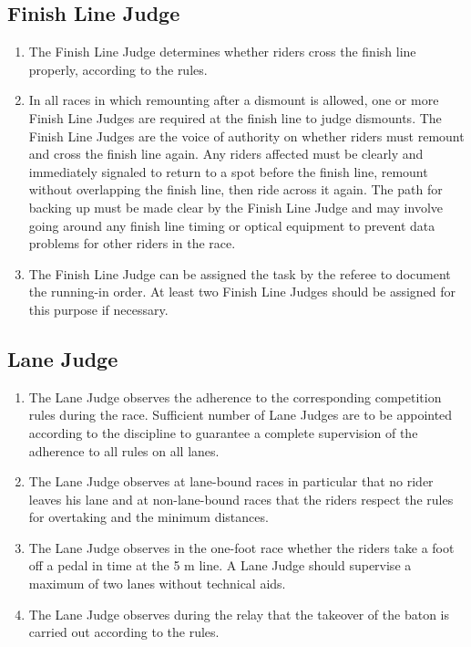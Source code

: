 \subsection{Finish Line Judge}

\begin{enumerate}[leftmargin=1.5em,labelsep=*]
	\item The Finish Line Judge determines whether riders cross the finish line properly, according to the rules.
	
	\item In all races in which remounting after a dismount is allowed, one or more Finish Line Judges are 
    required at the finish line to judge dismounts.
	The Finish Line Judges are the voice of authority on whether riders must remount and cross the finish line again.
	Any riders affected must be clearly and immediately signaled to return to a spot before the finish line, 
    remount without overlapping the finish line, then ride across it again.
	The path for backing up must be made clear by the Finish Line Judge and may involve going 
    around any finish line timing or optical equipment to prevent data problems for other riders in the race.
	
	\item The Finish Line Judge can be assigned the task by the referee to document the running-in order.
	At least two Finish Line Judges should be assigned for this purpose if necessary.
\end{enumerate}

\subsection{Lane Judge}

\begin{enumerate}[leftmargin=1.5em,labelsep=*]
	\item The Lane Judge observes the adherence to the corresponding competition rules during the race. 
    Sufficient number of Lane Judges are to be appointed according to the discipline to guarantee a 
    complete supervision of the adherence to all rules on all lanes.
	
	\item The Lane Judge observes at lane-bound races in particular that no rider leaves his lane and 
    at non-lane-bound races that the riders respect the rules for overtaking and the minimum distances.
	
	\item The Lane Judge observes in the one-foot race whether the riders take a foot off a pedal in time at 
    the 5 m line. A Lane Judge should supervise a maximum of two lanes without technical aids.
	
	\item The Lane Judge observes during the relay that the takeover of the baton is carried out 
    according to the rules.
\end{enumerate}


